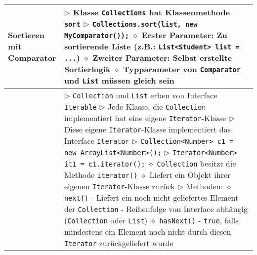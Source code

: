 \begin{longtable}{ | p{} p{} | }
	\makecell[l]{Sortieren mit \\ Comparator} & \makecell[l]{
	$\rhd$ Klasse \texttt{Collections} hat Klassenmethode \texttt{sort} \\
	$\rhd$ \texttt{Collections.sort(list, new MyComparator());} \\
	\hspace{0.4cm} $\diamond$ Erster Parameter: Zu sortierende Liste (z.B.: \texttt{List<Student> list = ...}) \\
	\hspace{0.4cm} $\diamond$ Zweiter Parameter: Selbst erstellte Sortierlogik \\
	\hspace{0.4cm} $\diamond$ Typparameter von \texttt{Comparator} und \texttt{List} müssen gleich sein } \\ \hline

	\makecell[l]{Interface \texttt{Iterator}} & \makecell[l]{
	$\rhd$ \texttt{Collection} und \texttt{List} erben von Interface \texttt{Iterable} \\
	$\rhd$ Jede Klasse, die \texttt{Collection} implementiert hat eine eigene \texttt{Iterator}-Klasse \\
	$\rhd$ Diese eigene \texttt{Iterator}-Klasse implementiert das Interface \texttt{Iterator} \\
	$\rhd$ \texttt{Collection<Number> c1 = new ArrayList<Number>();} \\
	$\rhd$ \texttt{Iterator<Number> it1 = c1.iterator();} \\
	\hspace{0.4cm} $\diamond$ \texttt{Collection} besitzt die Methode \texttt{iterator()} \\
	\hspace{0.4cm} $\diamond$ Liefert ein Objekt ihrer eigenen \texttt{Iterator}-Klasse zurück \\
	$\rhd$ Methoden: \\
	\hspace{0.4cm} $\diamond$ \texttt{next()} \\
	\hspace{0.6cm} - Liefert ein noch nicht geliefertes Element der \texttt{Collection} \\
	\hspace{0.6cm} - Reihenfolge von Interface abhängig (\texttt{Collection} oder \texttt{List}) \\
	\hspace{0.4cm} $\diamond$ \texttt{hasNext()} \\
	\hspace{0.6cm} - \texttt{true}, falls mindestens ein Element noch nicht durch \\
	\hspace{0.9cm} diesen \texttt{Iterator} zurückgeliefert wurde } \\ \hline


\end{longtable}
